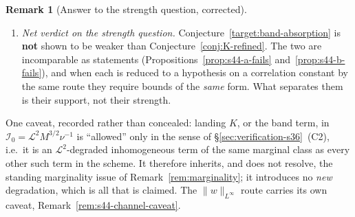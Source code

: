 \documentclass[11pt]{article}
\theoremstyle{definition}
\newtheorem{remark}[theorem]{Remark}
\theoremstyle{remark}
\begin{document}
\begin{remark}[Answer to the strength question, corrected]
\begin{enumerate}[label=(\arabic*)]
      first draft of this section asserted that
      Conjecture~\ref{conj:K-refined} could be weakened to an $O(1)$ statement
      without loss; that assertion is \textbf{withdrawn}
      (Remark~\ref{rem:s44-corrigendum}).
    \item \emph{Net verdict on the strength question.}
      Conjecture~\ref{target:band-absorption} is \textbf{not} shown to be
      weaker than Conjecture~\ref{conj:K-refined}. The two are incomparable as
      statements (Propositions~\ref{prop:s44-a-fails}
      and~\ref{prop:s44-b-fails}), and when each is reduced to a hypothesis on
      a correlation constant by the same route they require bounds of the
      \emph{same} form. What separates them is their support, not their
      strength.
  \end{enumerate}
  One caveat, recorded rather than concealed: landing $K$, or the band term,
  in $\mathcal{I}_0=\mathcal{L}^2M^{3/2}\nu^{-1}$ is ``allowed'' only in the
  sense of \S\ref{sec:verification-s36}~(C2), i.e.\ it is an
  $\mathcal{L}^2$-degraded inhomogeneous term of the same marginal class as
  every other such term in the scheme. It therefore inherits, and does not
  resolve, the standing marginality issue of Remark~\ref{rem:marginality}; it
  introduces no \emph{new} degradation, which is all that is claimed. The
  $\|w\|_{L^\infty}$ route carries its own caveat,
  Remark~\ref{rem:s44-channel-caveat}.
\end{remark}
\end{document}
